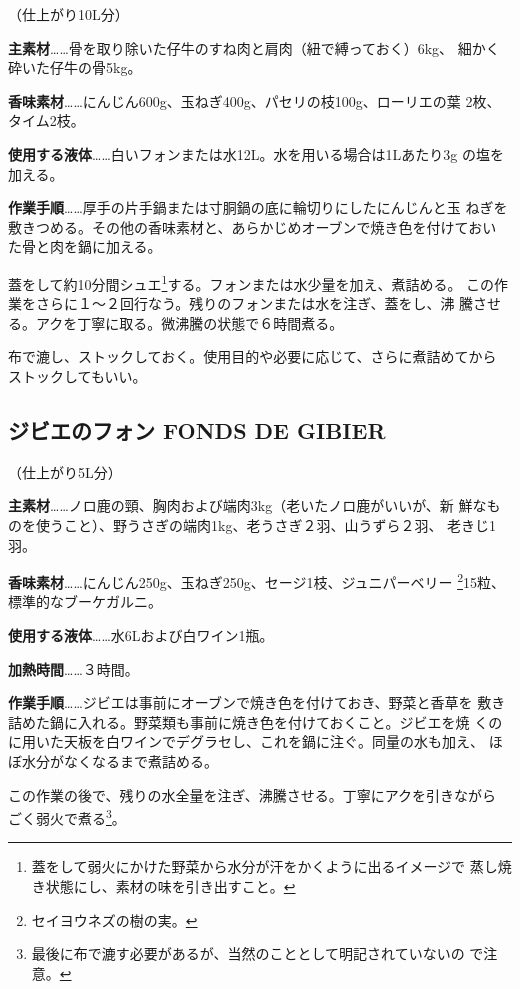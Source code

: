 \documentclass[twoside,12Q,b5paper]{escoffierltjsbook}
\begin{document}
（仕上がり10L分）

\textbf{主素材}\ldots{}\ldots{}骨を取り除いた仔牛のすね肉と肩肉（紐で縛っておく）6kg、
細かく砕いた仔牛の骨5kg。

\textbf{香味素材}\ldots{}\ldots{}にんじん600g、玉ねぎ400g、パセリの枝100g、ローリエの葉
2枚、タイム2枝。

\textbf{使用する液体}\ldots{}\ldots{}白いフォンまたは水12L。水を用いる場合は1Lあたり3g
の塩を加える。

\textbf{作業手順}\ldots{}\ldots{}厚手の片手鍋または寸胴鍋の底に輪切りにしたにんじんと玉
ねぎを敷きつめる。その他の香味素材と、あらかじめオーブンで焼き色を付けておい
た骨と肉を鍋に加える。

蓋をして約10分間シュエ\footnote{蓋をして弱火にかけた野菜から水分が汗をかくように出るイメージで
  蒸し焼き状態にし、素材の味を引き出すこと。}する。フォンまたは水少量を加え、煮詰める。
この作業をさらに１〜２回行なう。残りのフォンまたは水を注ぎ、蓋をし、沸
騰させる。アクを丁寧に取る。微沸騰の状態で６時間煮る。

布で漉し、ストックしておく。使用目的や必要に応じて、さらに煮詰めてから
ストックしてもいい。

\subsection*{ジビエのフォン FONDS DE
GIBIER}\label{ux30b8ux30d3ux30a8ux306eux30d5ux30a9ux30f3-fonds-de-gibier}

（仕上がり5L分）

\textbf{主素材}\ldots{}\ldots{}ノロ鹿の頸、胸肉および端肉3kg（老いたノロ鹿がいいが、新
鮮なものを使うこと）、野うさぎの端肉1kg、老うさぎ２羽、山うずら２羽、
老きじ1羽。

\textbf{香味素材}\ldots{}\ldots{}にんじん250g、玉ねぎ250g、セージ1枝、ジュニパーベリー
\footnote{セイヨウネズの樹の実。}15粒、標準的なブーケガルニ。

\textbf{使用する液体}\ldots{}\ldots{}水6Lおよび白ワイン1瓶。

\textbf{加熱時間}\ldots{}\ldots{}３時間。

\textbf{作業手順}\ldots{}\ldots{}ジビエは事前にオーブンで焼き色を付けておき、野菜と香草を
敷き詰めた鍋に入れる。野菜類も事前に焼き色を付けておくこと。ジビエを焼
くのに用いた天板を白ワインでデグラセし、これを鍋に注ぐ。同量の水も加え、
ほぼ水分がなくなるまで煮詰める。

この作業の後で、残りの水全量を注ぎ、沸騰させる。丁寧にアクを引きながら
ごく弱火で煮る\footnote{最後に布で漉す必要があるが、当然のこととして明記されていないの
  で注意。}。
\end{document}
